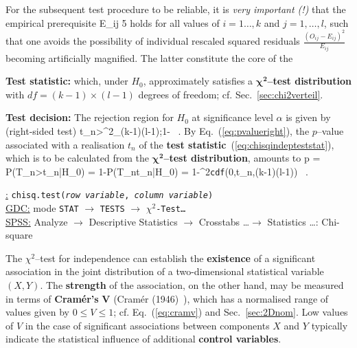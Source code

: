 \medskip
\noindent
For the subsequent test procedure to be reliable, it is
\textit{very important (!)} that the empirical prere\-quisite
%
\be
E_{ij} \stackrel{!}{\geq} 5
\ee
%  
holds for all values of $i=1\ldots,k$ and $j=1,\ldots,l$,
such that one avoids the possibility of individual rescaled 
squared residuals $\displaystyle 
\frac{(O_{ij}-E_{ij})^{2}}{E_{ij}}$ becoming artificially 
magnified. The latter constitute the core of the

\medskip
\noindent
\textbf{Test statistic:}
%
\be
{}
\ee
%
which, under $H_{0}$, approximately satisfies a 
$\boldsymbol{\chi^{2}}$\textbf{--test distribution} with $df=(k-1)
\times (l-1)$ degrees of freedom; cf. Sec.~\ref{sec:chi2verteil}.

\medskip
\noindent
\textbf{Test decision:} The rejection region for $H_{0}$ at 
significance level $\alpha$ is given by (right-sided test)
%
\be
t_{n}>\chi^{2}_{(k-1)\times(l-1);1-\alpha} \ .
\ee
%
By Eq.~(\ref{eq:pvalueright}), the $p$--value associated with a 
realisation $t_{n}$ of the \textbf{test
statistic}~(\ref{eq:chisqindepteststat}), which is to
be calculated from the $\boldsymbol{\chi^{2}}$\textbf{--test
distribution}, amounts to
%
\be
p = P(T_{n}>t_{n}|H_{0}) = 1-P(T_{n}\leq t_{n}|H_{0})
= 1-\chi^{2}\texttt{cdf}\left(0,t_{n},(k-1)\times(l-1)\right) \ .
\ee
%

\medskip
\noindent
\underline{\R:} \texttt{chisq.test(\textit{row variable},
\textit{column variable})} \\
\underline{GDC:} mode \texttt{STAT} $\rightarrow$ \texttt{TESTS}
$\rightarrow$ \texttt{$\chi^{2}$-Test\ldots} \\
\underline{SPSS:} Analyze $\rightarrow$ Descriptive Statistics
$\rightarrow$ Crosstabs \ldots $\rightarrow$ Statistics \ldots:
Chi-square

\medskip
\noindent
The $\chi^{2}$--test for independence can establish the 
\textbf{existence} of a significant association in the joint
distribution of a two-dimensional statistical variable~$(X,Y)$. 
The \textbf{strength} of the association, on the other hand, 
may be measured in terms of \textbf{Cram\'{e}r's} $\boldsymbol{V}$
(Cram\'{e}r (1946)~), which has a normalised range of 
values given by $0 \leq V \leq 1$; cf. Eq.~(\ref{eq:cramv}) and 
Sec.~\ref{sec:2Dnom}. Low values of $V$ in the case of significant 
associations between components $X$ and $Y$ typically indicate the 
statistical influence of additional \textbf{control variables}.

